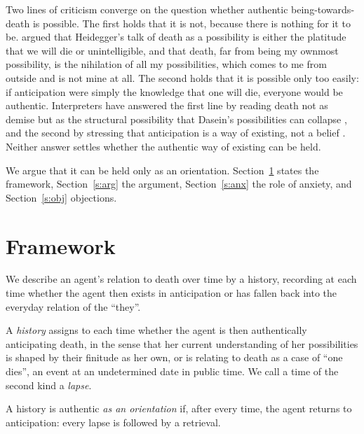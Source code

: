 \documentclass{situationist-preprint}
\begin{document}
Two lines of criticism converge on the question whether authentic being-towards-death is possible. The first holds that it is not, because there is nothing for it to be. \citet{Edwards1975} argued that Heidegger's talk of death as a possibility is either the platitude that we will die or unintelligible, and \citet[pt.~IV, ch.~1]{Sartre1943} that death, far from being my ownmost possibility, is the nihilation of all my possibilities, which comes to me from outside and is not mine at all. The second holds that it is possible only too easily: if anticipation were simply the knowledge that one will die, everyone would be authentic. Interpreters have answered the first line by reading death not as demise but as the structural possibility that Dasein's possibilities can collapse \citep{Haugeland2000, Blattner1999, Thomson2013}, and the second by stressing that anticipation is a way of existing, not a belief \citep{Carman2003}. Neither answer settles whether the authentic way of existing can be held.

We argue that it can be held only as an orientation. Section~\ref{s:frame} states the framework, Section~\ref{s:arg} the argument, Section~\ref{s:anx} the role of anxiety, and Section~\ref{s:obj} objections.

\section{Framework}\label{s:frame}

We describe an agent's relation to death over time by a history, recording at each time whether the agent then exists in anticipation or has fallen back into the everyday relation of the \enquote{they}.

\begin{definition}[History]\label{d:hist}
A \emph{history} assigns to each time whether the agent is then authentically anticipating death, in the sense that her current understanding of her possibilities is shaped by their finitude as her own, or is relating to death as a case of \enquote{one dies}, an event at an undetermined date in public time. We call a time of the second kind a \emph{lapse}.
\end{definition}

\begin{definition}[Orientation]\label{d:or}
A history is authentic \emph{as an orientation} if, after every time, the agent returns to anticipation: every lapse is followed by a retrieval.
\end{definition}
\end{document}
